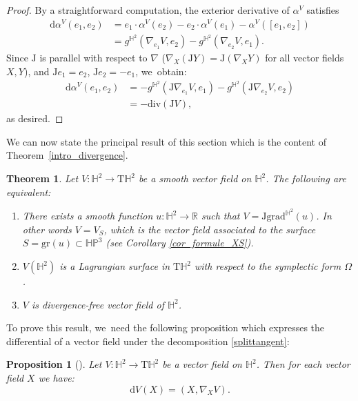 \documentclass[JEP,XML,SOM,Unicode,NoEqCountersInSection, NoFloatCountersInSection,published]{cedram}
\theoremstyle{plain}
\newtheorem{theorem}[cor]{Theorem}
\newtheorem{prop}[cor]{Proposition}
\theoremstyle{definition}
\newcommand{\HP}{\mathbb{HP}^3}
\newcommand{\grad}{\mathrm{grad}^{\mathbb{H}^2}}
\newcommand{\J}{\mathrm{J}}
\begin{document}
\begin{proof}
By a straightforward computation, the exterior derivative of \(\alpha^V \) satisfies
\begin{align*}
\mathrm{d} \alpha^V(e_1, e_2)
&= e_1 \cdot \alpha^V(e_2) - e_2 \cdot \alpha^V(e_1) - \alpha^V([e_1, e_2]) \\
&= g^{\mathbb{H}^2}(\nabla_{e_1} V, e_2) - g^{\mathbb{H}^2}(\nabla_{e_2} V, e_1).
\end{align*}
Since \(\mathrm{J} \) is parallel with respect to \(\nabla \) (\ie \(\nabla_X (\mathrm{J}Y) = \mathrm{J}(\nabla_X Y) \) for all vector fields \(X, Y \)), and \(\mathrm{J}e_1 = e_2 \), \(\mathrm{J}e_2 = -e_1 \), we~obtain:
\begin{align*}
\mathrm{d} \alpha^V(e_1, e_2)
&= -g^{\mathbb{H}^2}(\mathrm{J} \nabla_{e_1} V, e_1) - g^{\mathbb{H}^2}(\J\nabla_{e_2} V, e_2) \\
&= -\mathrm{div}(\mathrm{J}V),
\end{align*}
as desired.
\end{proof}

We can now state the principal result of this section which is the content of Theorem~\ref{intro_divergence}.
\begin{theorem}\label{Lagrange_vs_divergence_free}
Let $V:\mathbb{H}^2\to\mathrm{T}\mathbb{H}^2$ be a smooth vector field on $\mathbb{H}^2$. The following are equivalent:
\begin{enumerate}
\item\label{Lagrange_vs_divergence_free1} There exists a smooth function $u:\mathbb{H}^2\to\mathbb{R}$ such that $V=\J\grad(u)$. In other words $V=V_S$, which is the vector field associated to the surface $S=\mathrm{gr}(u)\subset\HP$ (see Corollary \ref{cor_formule_XS}).
\item\label{Lagrange_vs_divergence_free2} $V(\mathbb{H}^2)$ is a \emph{Lagrangian} surface in $\mathrm{T}\mathbb{H}^2$ with respect to the symplectic form $\Omega$.
\item\label{Lagrange_vs_divergence_free3} $V$ is divergence-free vector field of $\mathbb{H}^2$.
\end{enumerate}
\end{theorem}
To prove this result, we~need the following proposition which expresses the differential of a vector field under the decomposition \eqref{splittangent}:
\begin{prop}[{\cite[Prop.\,1.6]{on_harmonic_vector_field}}]\label{dV(X)}
Let $V:\mathbb{H}^2\to\mathrm{T}\mathbb{H}^2$ be a vector field on $\mathbb{H}^2$. Then for each vector field $X$ we have:
\[
\mathrm{d}V(X)=(X,\nabla_XV).
\]
\end{prop}
\end{document}
